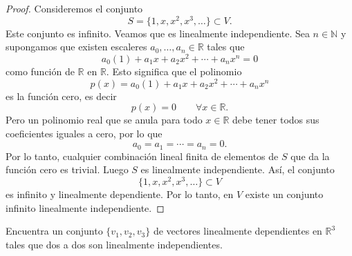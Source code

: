 \documentclass[12pt,a4paper]{article}
\begin{document}
    \begin{proof}
        Consideremos el conjunto
        \begin{equation*}
            S=\{1,x,x^{2},x^{3},\dots\}\subset V.
        \end{equation*}
        Este conjunto es infinito. Veamos que es linealmente independiente. Sea $n\in\mathbb{N}$
        y supongamos que existen escaleres $a_{0},\dots,a_{n}\in\mathbb{R}$ tales que
        \begin{equation*}
            a_{0}(1)+a_{1}x+a_{2}x^{2}+\cdots+a_{n}x^{n}=0
        \end{equation*}
        como función de $\mathbb{R}$ en $\mathbb{R}$. Esto significa que el polinomio
        \begin{equation*}
            p(x)=a_{0}(1)+a_{1}x+a_{2}x^{2}+\cdots+a_{n}x^{n}
        \end{equation*}
        es la función cero, es decir
        \begin{equation*}
            p(x)=0\qquad\forall x\in\mathbb{R}.
        \end{equation*}
        Pero un polinomio real que se anula para todo $x\in\mathbb{R}$ debe tener todos
        sus coeficientes iguales a cero, por lo que
        \begin{equation*}
            a_{0}=a_{1}=\cdots=a_{n}=0.
        \end{equation*}
        Por lo tanto, cualquier combinación lineal finita de elementos de $S$ que da la
        función cero es trivial. Luego $S$ es linealmente independiente. Así, el conjunto
        \begin{equation*}
            \{1,x,x^{2},x^{3},\dots\}\subset V
        \end{equation*}
        es infinito y linealmente dependiente. Por lo tanto, en $V$ existe un conjunto
        infinito linealmente independiente.
    \end{proof}

    \begin{mdframed}[style=mdbluebox,frametitle={Ejercicio 4}]
        Encuentra un conjunto $\{v_{1},v_{2},v_{3}\}$ de vectores linealmente dependientes en
        $\mathbb{R}^{3}$ tales que dos a dos son linealmente independientes.
    \end{mdframed}
\end{document}
